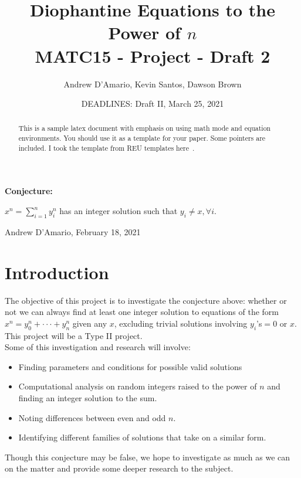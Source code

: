 \documentclass[psamsfonts]{amsart}
\title{Diophantine Equations to the Power of $n$ \\ \vspace{.3in} \large{MATC15 - Project - Draft 2}}
\author{Andrew D'Amario, Kevin Santos, Dawson Brown }
\date{DEADLINES: Draft II, March 25, 2021}
\theoremstyle{definition}
\theoremstyle{remark}
\numberwithin{equation}{section}
\begin{document}
\begin{abstract}

This is a sample latex document with emphasis on using math mode and
equation environments.  You should use it as a template for your paper.
Some pointers are included. I took the template from REU templates here~\cite{REU}.



\end{abstract}

\maketitle

\tableofcontents

\begin{flushleft}
  {\bf Conjecture:}

  \hspace{.5in}$\displaystyle x^n=\sum^{n}_{i=1}y_i^n$ has an integer solution such that $y_i\ne x, \forall i$.

  \hspace{2in} Andrew D'Amario, February 18, 2021
\end{flushleft}

\section{Introduction}
The objective of this project is to investigate the conjecture above: whether or not we can always find at least one integer solution to equations of the form $x^n=y_0^n+\cdot\cdot\cdot+y_n^n$ given any $x$, excluding trivial solutions involving $y_i$'s$=0$ or $x$. This project will be a Type II project. \\

Some of this investigation and research will involve:
\begin{itemize}    
    \item Finding parameters and conditions for possible valid solutions
    \item Computational analysis on random integers raised to the power of $n$ and finding an integer solution to the sum.
    \item Noting differences between even and odd $n$.
    \item Identifying different families of solutions that take on a similar form.
\end{itemize}

Though this conjecture may be false, we hope to investigate as much as we can on the matter and provide some deeper research to the subject.
\end{document}
